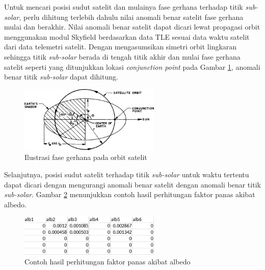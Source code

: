 Untuk mencari posisi sudut satelit dan mulainya fase gerhana terhadap titik
\textit{sub-solar}, perlu dihitung terlebih dahulu nilai anomali benar satelit
fase gerhana mulai dan berakhir. Nilai anomali benar satelit dapat dicari lewat
propagasi orbit menggunakan modul Skyfield berdasarkan data TLE sesuai data
waktu satelit dari data telemetri satelit. Dengan mengasumsikan simetri orbit
lingkaran sehingga titik \textit{sub-solar} berada di tengah titik akhir dan mulai fase gerhana satelit seperti yang ditunjukkan lokasi \textit{conjunction point} pada Gambar \ref{fig:ssp}, anomali benar titik \textit{sub-solar} dapat dihitung.

\begin{figure}[H]
\setlength{}
\begin{center}
\includegraphics[width=0.6\textwidth]{fig/ssp.jpg}
	\caption[Ilustrasi fase gerhana pada orbit satelit]{Ilustrasi fase gerhana pada orbit satelit~\cite{ismail2015}}
\label{fig:ssp}
\end{center}
\end{figure}

Selanjutnya, posisi sudut satelit terhadap titik \textit{sub-solar} untuk waktu
tertentu dapat dicari dengan mengurangi anomali benar satelit dengan anomali
benar titik \textit{sub-solar}. Gambar \ref{fig:albedofactor} menunjukkan
contoh hasil perhitungan faktor panas akibat albedo.

\begin{figure}[H]
\setlength{}
\begin{center}
\includegraphics[width=0.6\textwidth]{fig/albedofactor.png}
\caption{Contoh hasil perhitungan faktor panas akibat albedo}
\label{fig:albedofactor}
\end{center}
\end{figure}

